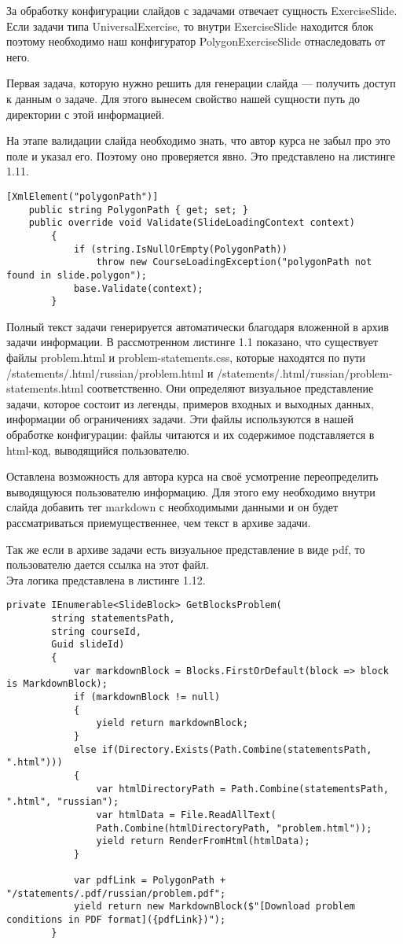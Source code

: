 За обработку конфигурации слайдов с задачами отвечает сущность ExerciseSlide. Если задачи типа UniversalExercise, то внутри ExerciseSlide находится блок  поэтому необходимо наш конфигуратор PolygonExerciseSlide отнаследовать от него.


Первая задача, которую нужно решить для генерации слайда — получить доступ к данным о задаче. Для этого вынесем свойство нашей сущности путь до директории с этой информацией.

На этапе валидации слайда необходимо знать, что автор курса не забыл про это поле и указал его. Поэтому оно проверяется явно. Это представлено на листинге 1.11.

\begin{lstlisting}[caption={Проверка полей}]
    [XmlElement("polygonPath")]
    public string PolygonPath { get; set; }
    public override void Validate(SlideLoadingContext context)
		{
			if (string.IsNullOrEmpty(PolygonPath))
				throw new CourseLoadingException("polygonPath not found in slide.polygon");
			base.Validate(context);
		}
\end{lstlisting}

Полный текст задачи генерируется автоматически благодаря вложенной в архив задачи информации. В рассмотренном листинге 1.1 показано, что существует файлы problem.html и problem-statements.css, которые находятся по пути /statements/.html/russian/problem.html и /statements/.html/russian/problem-statements.html соответственно. Они определяют визуальное представление задачи, которое состоит из легенды, примеров входных и выходных данных, информации об ограничениях задачи.
Эти файлы используются в нашей обработке конфигурации: файлы читаются и их содержимое подставляется в html-код, выводящийся пользователю.

Оставлена возможность для автора курса на своё усмотрение переопределить выводящуюся пользователю информацию. Для этого ему необходимо внутри слайда добавить тег markdown с необходимыми данными и он будет рассматриваться приемущественнее, чем текст в архиве задачи.

Так же если в архиве задачи есть визуальное представление в виде pdf, то пользователю дается ссылка на этот файл.\\

Эта логика представлена в листинге 1.12.
\begin{lstlisting}[caption={Формирование блоков}]
private IEnumerable<SlideBlock> GetBlocksProblem(
        string statementsPath, 
        string courseId, 
        Guid slideId)
		{
			var markdownBlock = Blocks.FirstOrDefault(block => block is MarkdownBlock);
			if (markdownBlock != null)
			{
				yield return markdownBlock;
			}
			else if(Directory.Exists(Path.Combine(statementsPath, ".html")))
			{
				var htmlDirectoryPath = Path.Combine(statementsPath, ".html", "russian");
				var htmlData = File.ReadAllText(
				Path.Combine(htmlDirectoryPath, "problem.html"));
				yield return RenderFromHtml(htmlData);
			}

			var pdfLink = PolygonPath + "/statements/.pdf/russian/problem.pdf";
			yield return new MarkdownBlock($"[Download problem conditions in PDF format]({pdfLink})");
		}
\end{lstlisting}

